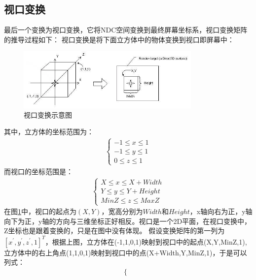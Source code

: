 	\subsection{视口变换}
	\begin{spacing}{2.5}
	最后一个变换为视口变换，它将NDC空间变换到最终屏幕坐标系，视口变换矩阵的推导过程如下：
	视口变换是将下面立方体中的物体变换到视口即屏幕中：
	\begin{figure}[H]
		\centering
		\includegraphics[width=0.8\textwidth]{images/viewport.png}
		\caption{视口变换示意图}
		\label{viewport}
	\end{figure}
	其中，立方体的坐标范围为：
	\begin{equation}
		\begin{split}
		\left\{\begin{matrix}
		-1\leq x\leq 1\\ 
		-1 \leq y \leq 1\\
		0 \leq z \leq 1
		\end{matrix}\right.
		\end{split}
	\end{equation}
	而视口的坐标范围是：
	\begin{equation}
		\begin{split}
		\left\{\begin{matrix}
		X \leq x\leq X + Width\\ 
		Y \leq y \leq Y + Height\\
		MinZ \leq z \leq MaxZ
		\end{matrix}\right.
		\end{split}
	\end{equation}
	在图\ref{viewport}中，视口的起点为$(X,Y)$，宽高分别为$Width$和$Height$，x轴向右为正，y轴向下为正，y轴的方向与三维坐标正好相反。视口是一个2D平面，在视口变换中，Z坐标也是跟着变换的，只是在图中没有体现。
	假设变换矩阵的第一列为$[x^{'},y^{'},z^{'},1]^{T}$，根据上图，立方体在(-1,1,0,1)映射到视口中的起点(X,Y,MinZ,1),立方体中的右上角点(1,1,0,1)映射到视口中的点(X+Width,Y,MinZ,1)，于是可以列式：
	\begin{equation}
	\begin{split}
		\left\{\begin{matrix}

\end{matrix}
\end{split}
\end{equation}
\end{spacing}
